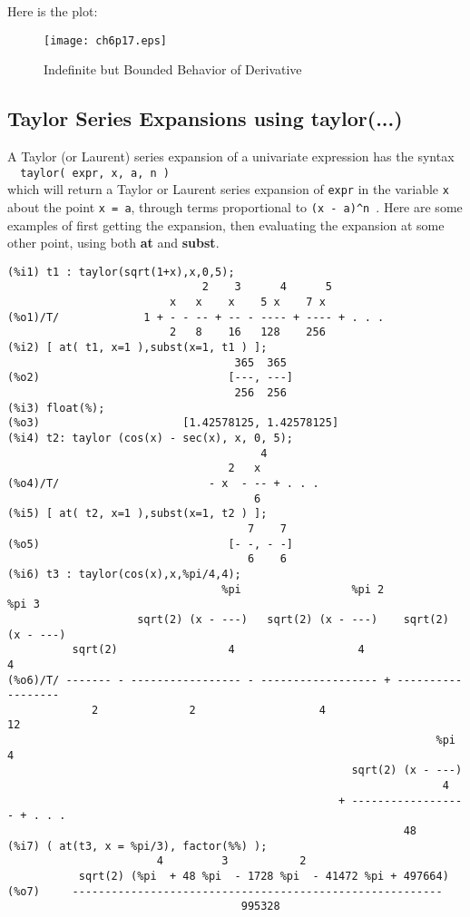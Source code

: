 \documentclass[12pt]{article}
\begin{document}
\smallskip
Here is the plot:  



\begin{figure} [h]
   \centerline{\texttt{[image: ch6p17.eps]} }
	\caption{ Indefinite but Bounded Behavior of Derivative }
\end{figure} 

\subsection{Taylor Series Expansions using taylor(...) }
A Taylor (or Laurent) series expansion of a univariate expression has the syntax\\
\verb|  taylor( expr, x, a, n ) |\\
  which will return a Taylor or Laurent series expansion of \verb|expr| in the
  variable \verb|x| about the point \verb|x = a|, through terms proportional
  to \verb|(x - a)^n |.
Here are some examples of first getting the expansion, then evaluating the
  expansion at some other point, using both \textbf{at} and \textbf{subst}.
\small
\begin{verbatim}
(%i1) t1 : taylor(sqrt(1+x),x,0,5);
                              2    3      4      5
                         x   x    x    5 x    7 x
(%o1)/T/             1 + - - -- + -- - ---- + ---- + . . .
                         2   8    16   128    256
(%i2) [ at( t1, x=1 ),subst(x=1, t1 ) ];
                                   365  365
(%o2)                             [---, ---]
                                   256  256
(%i3) float(%);
(%o3)                      [1.42578125, 1.42578125]
(%i4) t2: taylor (cos(x) - sec(x), x, 0, 5);
                                       4
                                  2   x
(%o4)/T/                       - x  - -- + . . .
                                      6
(%i5) [ at( t2, x=1 ),subst(x=1, t2 ) ];
                                     7    7
(%o5)                             [- -, - -]
                                     6    6
(%i6) t3 : taylor(cos(x),x,%pi/4,4);
                                 %pi                 %pi 2                %pi 3
                    sqrt(2) (x - ---)   sqrt(2) (x - ---)    sqrt(2) (x - ---)
          sqrt(2)                 4                   4                    4
(%o6)/T/ ------- - ----------------- - ------------------ + ------------------
             2              2                   4                    12
                                                                  %pi 4
                                                     sqrt(2) (x - ---)
                                                                   4
                                                   + ------------------ + . . .
                                                             48
(%i7) ( at(t3, x = %pi/3), factor(%%) );
                       4         3           2
           sqrt(2) (%pi  + 48 %pi  - 1728 %pi  - 41472 %pi + 497664)
(%o7)     ---------------------------------------------------------
                                    995328
\end{verbatim}
\end{document}
